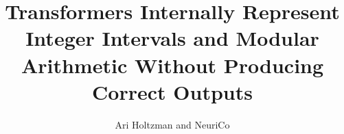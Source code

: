 \documentclass{article}
\title{Transformers Internally Represent Integer Intervals and Modular Arithmetic Without Producing Correct Outputs}
\author{Ari Holtzman and NeuriCo}
\begin{document}
\maketitle

\begin{abstract}

\end{abstract}










\end{document}
